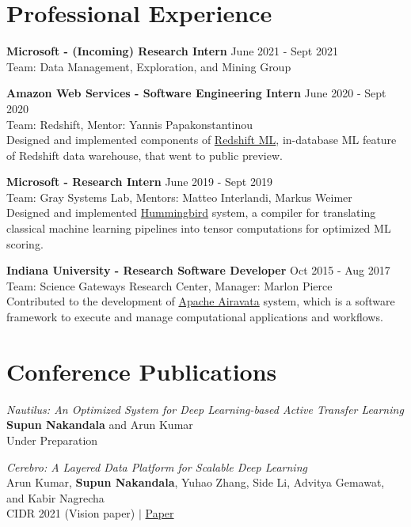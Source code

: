 \documentclass[margin]{res}
\begin{document}
\begin{resume}
\vspace{-4mm}
\section{Professional Experience}

\textbf{Microsoft - (Incoming) Research Intern}
\hfill June 2021 - Sept 2021 \\
Team: Data Management, Exploration, and Mining Group

\textbf{Amazon Web Services - Software Engineering Intern}
\hfill June 2020 - Sept 2020 \\
Team: Redshift, Mentor: Yannis Papakonstantinou\\
Designed and implemented components of \href{https://aws.amazon.com/redshift/features/redshift-ml/}{Redshift ML}, in-database ML feature of Redshift data warehouse, that went to public preview.

\textbf{Microsoft - Research Intern}
\hfill June 2019 - Sept 2019 \\
Team: Gray Systems Lab, Mentors: Matteo Interlandi, Markus Weimer\\
Designed and implemented \href{https://github.com/microsoft/hummingbird}{Hummingbird} system, a compiler for translating classical machine learning pipelines into tensor computations for optimized ML scoring.

\textbf{Indiana University - Research Software Developer}
\hfill Oct 2015 - Aug 2017 \\
Team: Science Gateways Research Center, Manager: Marlon Pierce\\
Contributed to the development of \href{https://airavata.apache.org/index.html}{Apache Airavata} system, which is a software framework to execute and manage computational applications and workflows.


\section{Conference Publications}
\par
\textit{Nautilus: An Optimized System for Deep Learning-based Active Transfer Learning} \\
\textbf{Supun Nakandala} and Arun Kumar\\
Under Preparation

\par
\textit{Cerebro: A Layered Data Platform for Scalable Deep Learning} \\
Arun Kumar, \textbf{Supun Nakandala}, Yuhao Zhang,  Side Li, Advitya Gemawat, and Kabir
Nagrecha\\
CIDR 2021 (Vision paper) $|$ \href{https://adalabucsd.github.io/papers/2021_Cerebro_CIDR.pdf}{Paper}


\end{resume}
\end{document}
